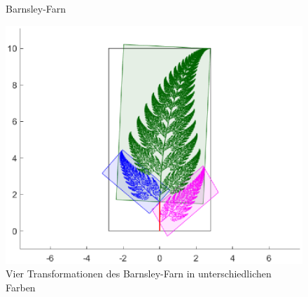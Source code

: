 \begin{figure}	
	\centering
	\caption{Barnsley-Farn}
	\label{ifs:farn}
\end{figure}
\begin{figure}
	\centering
	\includegraphics[width=\textwidth]{papers/ifs/images/farncolor2}
	\caption{Vier Transformationen des Barnsley-Farn in unterschiedlichen Farben}
	\label{ifs:farncolor}
\end{figure}
